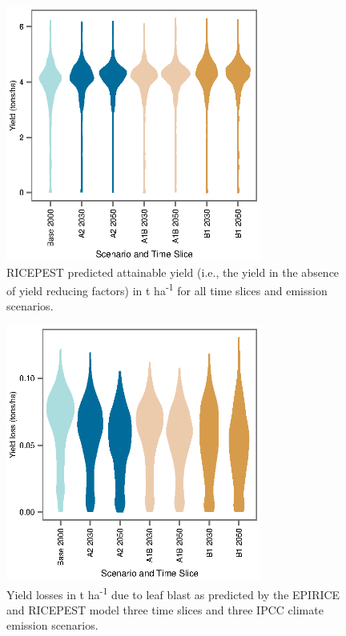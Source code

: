     \begin{figure}
      \includegraphics[width = 84mm]{figures/Yield_Attainable_Violin}
      \caption{RICEPEST predicted attainable yield (i.e., the yield in the absence of yield reducing factors) in t ha\textsuperscript{-1} for all time slices and emission scenarios.}
      \label{Yield_Attainable_Violin}
    \end{figure}

    \begin{figure}
      \includegraphics[width = 84mm]{Figures/LB_Losses_Violin}
      \caption{Yield losses in t ha\textsuperscript{-1} due to leaf blast as predicted by the EPIRICE and RICEPEST model three time slices and three IPCC climate emission scenarios.}
      \label{LB_Losses_Violin}
    \end{figure}

